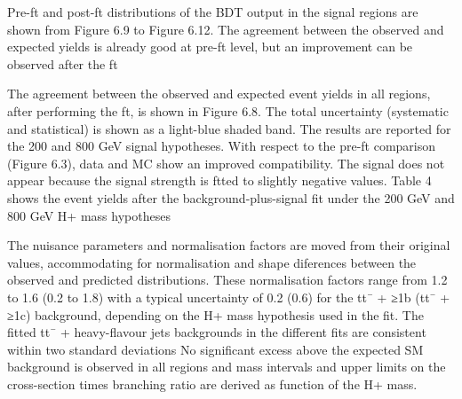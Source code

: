 Pre-ft and post-ft distributions of the BDT output in the signal regions are shown from
Figure 6.9 to Figure 6.12. The agreement between the observed and expected yields is
already good at pre-ft level, but an improvement can be observed after the ft

The agreement between
the observed and expected event yields in all regions, after performing the ft, is shown in
Figure 6.8. The total uncertainty (systematic and statistical) is shown as a light-blue shadedband. The results are reported for the 200 and 800 GeV signal hypotheses. With respect
to the pre-ft comparison (Figure 6.3), data and MC show an improved compatibility. The
signal does not appear because the signal strength is ftted to slightly negative values.
Table 4 shows the event yields after the background-plus-signal fit under the 200 GeV
and 800 GeV H+ mass hypotheses

The nuisance
parameters and normalisation factors are moved from their original values, accommodating for normalisation and
shape diferences between the observed and predicted distributions. These normalisation factors range from 1.2 to 1.6
(0.2 to 1.8) with a typical uncertainty of 0.2 (0.6) for the tt¯ + ≥1b (tt¯ + ≥1c) background,
depending on the H+ mass hypothesis used in the fit. The fitted tt¯ + heavy-flavour jets
backgrounds in the different fits are consistent within two standard deviations
No significant excess above the expected SM background
is observed in all regions and mass intervals and upper limits on the cross-section times
branching ratio are derived as function of the H+ mass.

